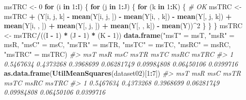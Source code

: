 \documentclass[
]{book}
\newenvironment{Shaded}{\begin{snugshade}}{\end{snugshade}}
\newcommand{\CommentTok}[1]{\textcolor[rgb]{0.56,0.35,0.01}{\textit{#1}}}
\newcommand{\ControlFlowTok}[1]{\textcolor[rgb]{0.13,0.29,0.53}{\textbf{#1}}}
\newcommand{\DecValTok}[1]{\textcolor[rgb]{0.00,0.00,0.81}{#1}}
\newcommand{\KeywordTok}[1]{\textcolor[rgb]{0.13,0.29,0.53}{\textbf{#1}}}
\newcommand{\NormalTok}[1]{#1}
\newcommand{\OperatorTok}[1]{\textcolor[rgb]{0.81,0.36,0.00}{\textbf{#1}}}
\newcommand{\StringTok}[1]{\textcolor[rgb]{0.31,0.60,0.02}{#1}}
\begin{document}
\begin{Shaded}
\begin{Highlighting}[]
\NormalTok{msTRC \textless{}{-}}\StringTok{ }\DecValTok{0}
\ControlFlowTok{for}\NormalTok{ (i }\ControlFlowTok{in} \DecValTok{1}\OperatorTok{:}\NormalTok{I) \{}
  \ControlFlowTok{for}\NormalTok{ (j }\ControlFlowTok{in} \DecValTok{1}\OperatorTok{:}\NormalTok{J) \{}
    \ControlFlowTok{for}\NormalTok{ (k }\ControlFlowTok{in} \DecValTok{1}\OperatorTok{:}\NormalTok{K) \{ }\CommentTok{\# OK}
\NormalTok{      msTRC \textless{}{-}}\StringTok{ }\NormalTok{msTRC }\OperatorTok{+}\StringTok{ }\NormalTok{(Y[i, j, k] }\OperatorTok{{-}}\StringTok{ }\KeywordTok{mean}\NormalTok{(Y[i, j, ]) }\OperatorTok{{-}}\StringTok{ }\KeywordTok{mean}\NormalTok{(Y[i, , k]) }\OperatorTok{{-}}\StringTok{ }\KeywordTok{mean}\NormalTok{(Y[, j, k]) }\OperatorTok{+}\StringTok{ }\KeywordTok{mean}\NormalTok{(Y[i, , ]) }\OperatorTok{+}\StringTok{ }\KeywordTok{mean}\NormalTok{(Y[, j, ]) }\OperatorTok{+}\StringTok{ }\KeywordTok{mean}\NormalTok{(Y[, , k]) }\OperatorTok{{-}}\StringTok{ }\KeywordTok{mean}\NormalTok{(Y))}\OperatorTok{\^{}}\DecValTok{2}
\NormalTok{    \}}
\NormalTok{  \}}
\NormalTok{\}}
\NormalTok{msTRC \textless{}{-}}\StringTok{ }\NormalTok{msTRC}\OperatorTok{/}\NormalTok{((I }\OperatorTok{{-}}\StringTok{ }\DecValTok{1}\NormalTok{) }\OperatorTok{*}\StringTok{ }\NormalTok{(J }\OperatorTok{{-}}\StringTok{ }\DecValTok{1}\NormalTok{) }\OperatorTok{*}\StringTok{ }\NormalTok{(K }\OperatorTok{{-}}\StringTok{ }\DecValTok{1}\NormalTok{))}
\KeywordTok{data.frame}\NormalTok{(}\StringTok{"msT"}\NormalTok{ =}\StringTok{ }\NormalTok{msT, }\StringTok{"msR"}\NormalTok{ =}\StringTok{ }\NormalTok{msR, }\StringTok{"msC"}\NormalTok{ =}\StringTok{ }\NormalTok{msC, }\StringTok{"msTR"}\NormalTok{ =}\StringTok{ }\NormalTok{msTR, }\StringTok{"msTC"}\NormalTok{ =}\StringTok{ }\NormalTok{msTC, }\StringTok{"msRC"}\NormalTok{ =}\StringTok{ }\NormalTok{msRC, }\StringTok{"msTRC"}\NormalTok{ =}\StringTok{ }\NormalTok{msTRC)}
\CommentTok{\#\textgreater{}         msT       msR       msC       msTR       msTC       msRC     msTRC}
\CommentTok{\#\textgreater{} 1 0.5467634 0.4373268 0.3968699 0.06281749 0.09984808 0.06450106 0.0399716}
\KeywordTok{as.data.frame}\NormalTok{(}\KeywordTok{UtilMeanSquares}\NormalTok{(dataset02)[}\DecValTok{1}\OperatorTok{:}\DecValTok{7}\NormalTok{])}
\CommentTok{\#\textgreater{}         msT       msR       msC       msTR       msTC       msRC     msTRC}
\CommentTok{\#\textgreater{} 1 0.5467634 0.4373268 0.3968699 0.06281749 0.09984808 0.06450106 0.0399716}
\end{Highlighting}
\end{Shaded}
\end{document}
